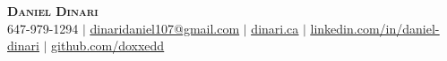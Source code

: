 \begin{center}
    \textbf{\Huge \scshape Daniel Dinari} \\ \vspace{1pt}
    \small 647-979-1294 $|$ 
    \href{mailto:dinaridaniel107@gmail.com}{\underline{dinaridaniel107@gmail.com}} $|$ 
    \href{https://dinari.ca/}{\underline{dinari.ca}} $|$
    \href{https://www.linkedin.com/in/daniel-dinari/}{\underline{linkedin.com/in/daniel-dinari}} $|$
    \href{https://github.com/doxxedd}{\underline{github.com/doxxedd}}
\end{center}
